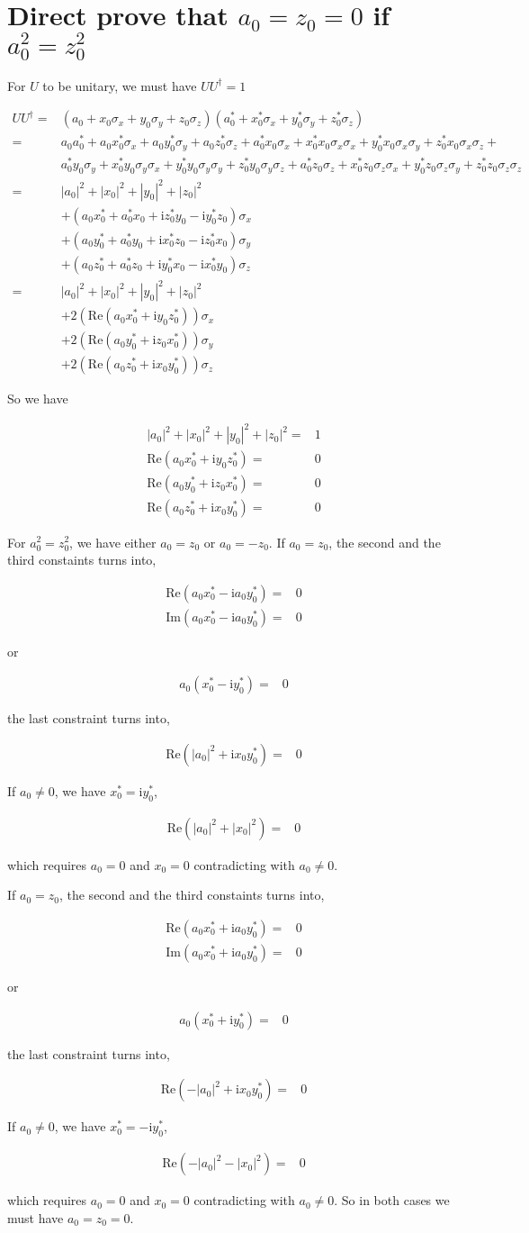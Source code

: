 \documentclass[10pt,fleqn]{article}
\newcommand{\ui}{\mathrm{i}}
\newcommand{\eqar}[1]
{
  \begin{align*}
    #1
  \end{align*}
}
\newcommand{\paren}[1]{{\left({#1}\right)}}
\newcommand{\abs}[1]{{\left|{#1}\right|}}
\begin{document}
\section{Direct prove that $a_0=z_0=0$ if $a_0^2=z_0^2$}
\label{ap:prove-a0z0}
For $U$ to be unitary, we must have $UU^\dagger=1$
\eqar{
  UU^\dagger=&\paren{a_0 + x_0 \sigma_x + y_0 \sigma_y + z_0 \sigma_z}\paren{a_0^* + x_0^* \sigma_x + y_0^* \sigma_y + z_0^* \sigma_z}\\
  =&a_0a_0^* + a_0x_0^* \sigma_x + a_0y_0^* \sigma_y + a_0z_0^* \sigma_z + a_0^*x_0 \sigma_x + x_0^*x_0 \sigma_x \sigma_x + y_0^*x_0 \sigma_x \sigma_y + z_0^*x_0 \sigma_x \sigma_z +\\
  &a_0^*y_0 \sigma_y + x_0^* y_0 \sigma_y\sigma_x + y_0^* y_0 \sigma_y\sigma_y + z_0^* y_0 \sigma_y\sigma_z + a_0^*z_0 \sigma_z + x_0^* z_0 \sigma_z\sigma_x + y_0^* z_0 \sigma_z\sigma_y + z_0^* z_0 \sigma_z\sigma_z\\
  =&\abs{a_0}^2 + \abs{x_0}^2 + \abs{y_0}^2 + \abs{z_0}^2\\
  &+\paren{a_0 x_0^* + a_0^* x_0 + \ui z_0^* y_0 - \ui y_0^* z_0}\sigma_x\\
  &+\paren{a_0 y_0^* + a_0^* y_0 + \ui x_0^* z_0 - \ui z_0^* x_0}\sigma_y\\
  &+\paren{a_0 z_0^* + a_0^* z_0 + \ui y_0^* x_0 - \ui x_0^* y_0}\sigma_z\\
  =&\abs{a_0}^2 + \abs{x_0}^2 + \abs{y_0}^2 + \abs{z_0}^2\\
  &+2\paren{\mathrm{Re}\paren{a_0 x_0^* + \ui y_0 z_0^*}}\sigma_x\\
  &+2\paren{\mathrm{Re}\paren{a_0 y_0^* + \ui z_0 x_0^*}}\sigma_y\\
  &+2\paren{\mathrm{Re}\paren{a_0 z_0^* + \ui x_0 y_0^*}}\sigma_z
}
So we have
\eqar{
  \abs{a_0}^2 + \abs{x_0}^2 + \abs{y_0}^2 + \abs{z_0}^2=&1\\
  \mathrm{Re}\paren{a_0 x_0^* + \ui y_0 z_0^*}=&0\\
  \mathrm{Re}\paren{a_0 y_0^* + \ui z_0 x_0^*}=&0\\
  \mathrm{Re}\paren{a_0 z_0^* + \ui x_0 y_0^*}=&0
}
For $a_0^2=z_0^2$, we have either $a_0=z_0$ or $a_0=-z_0$.
If $a_0=z_0$, the second and the third constaints turns into,
\eqar{
  \mathrm{Re}\paren{a_0 x_0^* - \ui a_0 y_0^*}=&0\\
  \mathrm{Im}\paren{a_0 x_0^* - \ui a_0 y_0^*}=&0
}
or
\eqar{
  a_0 \paren{x_0^* - \ui y_0^*}=&0
}
the last constraint turns into,
\eqar{
  \mathrm{Re}\paren{\abs{a_0}^2 + \ui x_0 y_0^*}=&0
}
If $a_0\neq0$, we have $x_0^* = \ui y_0^*$,
\eqar{
  \mathrm{Re}\paren{\abs{a_0}^2 + \abs{x_0}^2}=&0
}
which requires $a_0=0$ and $x_0=0$ contradicting with $a_0\neq0$.

If $a_0=z_0$, the second and the third constaints turns into,
\eqar{
  \mathrm{Re}\paren{a_0 x_0^* + \ui a_0 y_0^*}=&0\\
  \mathrm{Im}\paren{a_0 x_0^* + \ui a_0 y_0^*}=&0
}
or
\eqar{
  a_0 \paren{x_0^* + \ui y_0^*}=&0
}
the last constraint turns into,
\eqar{
  \mathrm{Re}\paren{-\abs{a_0}^2 + \ui x_0 y_0^*}=&0
}
If $a_0\neq0$, we have $x_0^* = -\ui y_0^*$,
\eqar{
  \mathrm{Re}\paren{-\abs{a_0}^2 - \abs{x_0}^2}=&0
}
which requires $a_0=0$ and $x_0=0$ contradicting with $a_0\neq0$.
So in both cases we must have $a_0=z_0=0$.
\end{document}
